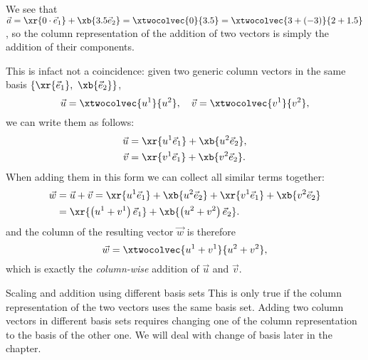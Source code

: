 \begin{center}
\end{center}

We see that $\vec{a}=\xr{0\cdot\vec{e}_{1}}+\xb{3.5\vec{e}_{2}}=\xtwocolvec{0}{3.5} = \xtwocolvec{3+(-3)}{2+1.5}$, so the column representation of the addition of two vectors is simply the addition of their components.

This is infact not a coincidence: given two generic column vectors in the same basis $\left\{\xr{\vec{e}_{1}},\ \xb{\vec{e}_{2}}\right\}$,
\[
  \vec{u}=\xtwocolvec{u^{1}}{u^{2}},\quad\vec{v}=\xtwocolvec{v^{1}}{v^{2}},
\]
we can write them as follows:
\begin{align*}
  \vec{u} &= \xr{u^{1}\vec{e}_{1}} + \xb{u^{2}\vec{e}_{2}},\\
  \vec{v} &= \xr{v^{1}\vec{e}_{1}} + \xb{v^{2}\vec{e}_{2}}.
\end{align*}
When adding them in this form we can collect all similar terms together:
\begin{align*}
  \vec{w} &= \vec{u} + \vec{v} = \xr{u^{1}\vec{e}_{1}} + \xb{u^{2}\vec{e}_{2}} + \xr{v^{1}\vec{e}_{1}} + \xb{v^{2}\vec{e}_{2}}\\
          &= \xr{\left(u^{1}+v^{1}\right)\vec{e}_{1}} + \xb{\left(u^{2}+v^{2}\right)\vec{e}_{2}}.
\end{align*}
and the column of the resulting vector $\vec{w}$ is therefore
\[
  \vec{w} = \xtwocolvec{u^{1}+v^{1}}{u^{2}+v^{2}},
\]
which is exactly the \emph{column-wise} addition of $\vec{u}$ and $\vec{v}$.

\begin{note}{Scaling and addition using different basis sets}{}
This is only true if the column representation of the two vectors uses the same basis set. Adding two column vectors in different basis sets requires changing one of the column representation to the basis of the other one. We will deal with change of basis later in the chapter.
\end{note}

